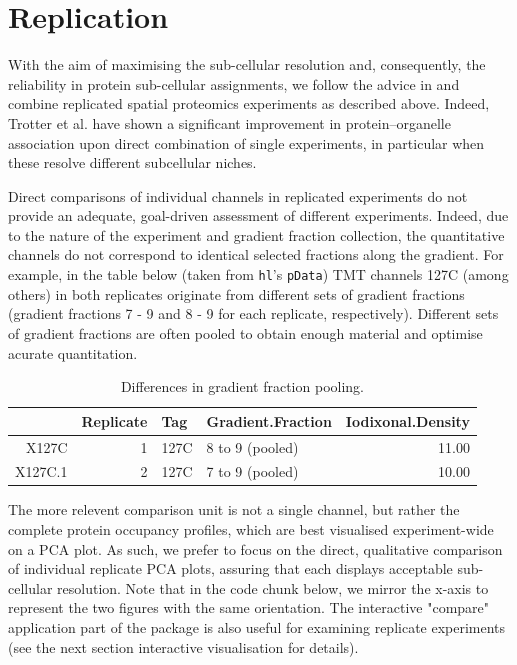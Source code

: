 \pagebreak

\section*{Replication}

With the aim of maximising the sub-cellular resolution and,
consequently, the reliability in protein sub-cellular assignments, we
follow the advice in \cite{Trotter:2010} and combine replicated spatial
proteomics experiments as described above. Indeed, Trotter et
al. have shown a significant improvement in protein–organelle
association upon direct combination of single experiments, in
particular when these resolve different subcellular niches.

Direct comparisons of individual channels in replicated experiments
do not provide an adequate, goal-driven assessment of different
experiments. Indeed, due to the nature of the experiment and gradient
fraction collection, the quantitative channels do not correspond to
identical selected fractions along the gradient. For example, in the
table below (taken from \texttt{hl}'s \texttt{pData}) TMT channels
127C (among others) in both replicates originate from different sets
of gradient fractions (gradient fractions 7 - 9 and 8 - 9 for each
replicate, respectively). Different sets of gradient fractions are
often pooled to obtain enough material and optimise acurate
quantitation.

\begin{table}[ht]
\centering
\begin{tabular}{rrllr}
  \hline
 & Replicate & Tag & Gradient.Fraction & Iodixonal.Density \\ 
  \hline
X127C &   1 & 127C & 8 to 9 (pooled) & 11.00 \\ 
  X127C.1 &   2 & 127C & 7 to 9 (pooled) & 10.00 \\ 
   \hline
\end{tabular}
\caption{Differences in gradient fraction pooling.} 
\label{tab:pdtab}
\end{table}


\pagebreak

The more relevent comparison unit is not a single channel, but rather
the complete protein occupancy profiles, which are best visualised
experiment-wide on a PCA plot. As such, we prefer to focus on the
direct, qualitative comparison of individual replicate PCA plots,
assuring that each displays acceptable sub-cellular resolution. Note
that in the code chunk below, we mirror the x-axis to represent the
two figures with the same orientation. The interactive "compare"
application part of the  package is also useful for
examining replicate experiments (see the next section interactive
visualisation for details).

